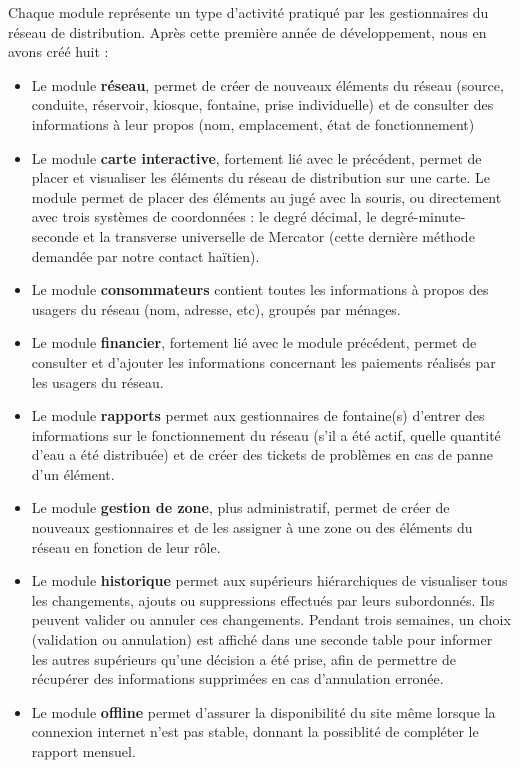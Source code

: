 \documentclass{EPL-master-thesis-covers-FR}
\begin{document}
			Chaque module représente un type d'activité pratiqué par les gestionnaires du réseau de distribution. Après cette première année de développement, nous en avons créé huit :
			\begin{itemize}
				\item Le module \textbf{réseau}, permet de créer de nouveaux éléments du réseau (source, conduite, réservoir, kiosque, fontaine, prise individuelle) et de consulter des informations à leur propos (nom, emplacement, état de fonctionnement)
				\item Le module \textbf{carte interactive}, fortement lié avec le précédent, permet de placer et visualiser les éléments du réseau de distribution sur une carte. Le module permet de placer des éléments au jugé avec la souris, ou directement avec trois systèmes de coordonnées : le degré décimal, le degré-minute-seconde et la transverse universelle de Mercator (cette dernière méthode demandée par notre contact haïtien).
				\item Le module \textbf{consommateurs} contient toutes les informations à propos des usagers du réseau (nom, adresse, etc), groupés par ménages.
				\item Le module \textbf{financier}, fortement lié avec le module précédent, permet de consulter et d'ajouter les informations concernant les paiements réalisés par les usagers du réseau.
				\item Le module \textbf{rapports} permet aux gestionnaires de fontaine(s) d'entrer des informations sur le fonctionnement du réseau (s'il a été actif, quelle quantité d'eau a été distribuée) et de créer des tickets de problèmes en cas de panne d'un élément.
				\item Le module \textbf{gestion de zone}, plus administratif, permet de créer de nouveaux gestionnaires et de les assigner à une zone ou des éléments du réseau en fonction de leur rôle.
				\item Le module \textbf{historique} permet aux supérieurs hiérarchiques de visualiser tous les changements, ajouts ou suppressions effectués par leurs subordonnés. Ils peuvent valider ou annuler ces changements. Pendant trois semaines, un choix (validation ou annulation) est affiché dans une seconde table pour informer les autres supérieurs qu'une décision a été prise, afin de permettre de récupérer des informations supprimées en cas d'annulation erronée.
				\item Le module \textbf{offline} permet d'assurer la disponibilité du site même lorsque la connexion internet n'est pas stable, donnant la possiblité de compléter le rapport mensuel.
			\end{itemize}
\end{document}
